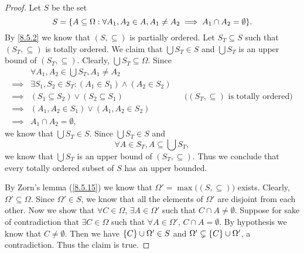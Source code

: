 \begin{proof}
  Let \(S\) be the set
  \[
    S = \set{A \subseteq \Omega : \forall A_1, A_2 \in A, A_1 \neq A_2 \implies A_1 \cap A_2 = \emptyset}.
  \]
  By \cref{8.5.2} we know that \((S, \subseteq)\) is partially ordered.
  Let \(S_T \subseteq S\) such that \((S_T, \subseteq)\) is totally ordered.
  We claim that \(\bigcup S_T \in S\) and \(\bigcup S_T\) is an upper bound of \((S_T, \subseteq)\).
  Clearly, \(\bigcup S_T \subseteq \Omega\).
  Since
  \begin{align*}
             & \forall A_1, A_2 \in \bigcup S_T, A_1 \neq A_2                                                                     \\
    \implies & \exists S_1, S_2 \in S_T : (A_1 \in S_1) \land (A_2 \in S_2)                                                       \\
    \implies & (S_1 \subseteq S_2) \lor (S_2 \subseteq S_1)                 &  & \text{(\((S_T, \subseteq)\) is totally ordered)} \\
    \implies & (A_1, A_2 \in S_1) \lor (A_1, A_2 \in S_2)                                                                         \\
    \implies & A_1 \cap A_2 = \emptyset,
  \end{align*}
  we know that \(\bigcup S_T \in S\).
  Since \(\bigcup S_T \in S\) and
  \[
    \forall A \in S_T, A \subseteq \bigcup S_T,
  \]
  we know that \(\bigcup S_T\) is an upper bound of \((S_T, \subseteq)\).
  Thus we conclude that every totally ordered subset of \(S\) has an upper bounded.

  By Zorn's lemma (\cref{8.5.15}) we know that \(\Omega' = \max\big((S, \subseteq)\big)\) exists.
  Clearly, \(\Omega' \subseteq \Omega\).
  Since \(\Omega' \in S\), we know that all the elements of \(\Omega'\) are disjoint from each other.
  Now we show that \(\forall C \in \Omega\), \(\exists A \in \Omega'\) such that \(C \cap A \neq \emptyset\).
  Suppose for sake of contradiction that \(\exists C \in \Omega\) such that \(\forall A \in \Omega'\), \(C \cap A = \emptyset\).
  By hypothesis we know that \(C \neq \emptyset\).
  Then we have \(\left\lbrace C\right\rbrace \cup \Omega' \in S\) and \(\Omega' \subsetneq \left\lbrace C\right\rbrace \cup \Omega'\), a contradiction.
  Thus the claim is true.


\end{proof}
